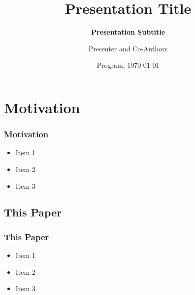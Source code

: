 \documentclass[11pt]{beamer}
\begin{document}
	
	
	\title[Presentation Title]{\bfseries Presentation Title}
	\subtitle{\bfseries Presentation Subtitle}
	\author[Name]{Presenter and Co-Authors}
	
	
	\date[\today]{Program, \today}
	
	\begin{frame}[plain]
		\maketitle
		
	\end{frame}

\section{Motivation}
	\begin{frame}
		\frametitle{\textbf{Motivation}}
		
		\begin{itemize}
			\item Item 1
			\item Item 2
			\item Item 3
		\end{itemize}
	\end{frame}
	
	\begin{frame}
		\section{This Paper}
		\frametitle{\textbf{This Paper}}
		
		\begin{itemize}
			\item Item 1
			\item Item 2
			\item Item 3
		\end{itemize}
	\end{frame}
\end{document}
